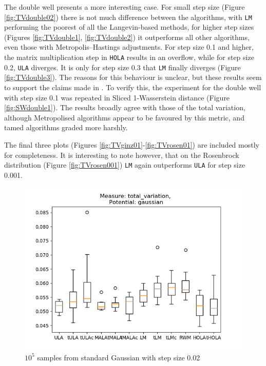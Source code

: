 The double well presents a more interesting case.  For small step size (Figure \ref{fig:TVdouble02}) there is not much difference between the algorithms, with \texttt{LM} performing the poorest of all the Langevin-based methods, for higher step sizes (Figures \ref{fig:TVdouble1}, \ref{fig:TVdouble2}) it outperforms all other algorithms, even those with Metropolis--Hastings adjustments.  For step size 0.1 and higher, the matrix multiplication step in \texttt{HOLA} results in an overflow, while for step size 0.2, \texttt{ULA} diverges.  It is only for step size 0.3 that \texttt{LM} finally diverges (Figure \ref{fig:TVdouble3}).  The reasons for this behaviour is unclear, but these results seem to support the claims made in \cite{LM12}.  To verify this, the experiment for the double well with step size 0.1 was repeated in Sliced 1-Wasserstein distance (Figure \ref{fig:SWdouble1}).  The results broadly agree with those of the total variation, although Metropolised algorithms appear to be favoured by this metric, and tamed algorithms graded more harshly.

The final three plots (Figures \ref{fig:TVginz01}-\ref{fig:TVrosen01}) are included mostly for completeness.  It is interesting to note however, that on the Rosenbrock distribution (Figure \ref{fig:TVrosen001}) \texttt{LM} again outperforms \texttt{ULA} for step size 0.001.
\begin{figure}[ht!]
	\centering
		\includegraphics[height=0.43\textheight]{Figures/TV_gaussian11_step0pt02.png}
	\caption{$10^5$ samples from standard Gaussian with step size 0.02}
	\label{fig:TVgauss}
\end{figure}

